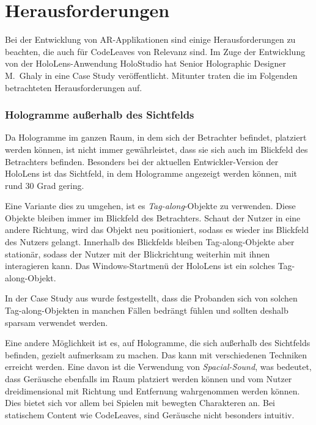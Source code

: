 \section{Herausforderungen}

Bei der Entwicklung von AR-Applikationen sind einige Herausforderungen zu beachten, die auch für CodeLeaves von Relevanz sind. Im Zuge der Entwicklung von der HoloLens-Anwendung HoloStudio hat Senior Holographic Designer M.\ Ghaly in \cite{windows2017casestudy3} eine Case Study veröffentlicht. Mitunter traten die im Folgenden betrachteten Herausforderungen auf.

\subsubsection*{Hologramme außerhalb des Sichtfelds}

Da Hologramme im ganzen Raum, in dem sich der Betrachter befindet, platziert werden können, ist nicht immer gewährleistet, dass sie sich auch im Blickfeld des Betrachters befinden. Besonders bei der aktuellen Entwickler-Version der HoloLens ist das Sichtfeld, in dem Hologramme angezeigt werden können, mit rund 30 Grad \cite{czerulla2017microsoft} gering.

Eine Variante dies zu umgehen, ist es \textit{Tag-along}-Objekte zu verwenden. Diese Objekte bleiben immer im Blickfeld des Betrachters. Schaut der Nutzer in eine andere Richtung, wird das Objekt neu positioniert, sodass es wieder ins Blickfeld des Nutzers gelangt. Innerhalb des Blickfelds bleiben Tag-along-Objekte aber stationär, sodass der Nutzer mit der Blickrichtung weiterhin mit ihnen interagieren kann. Das Windows-Startmenü der HoloLens ist ein solches Tag-along-Objekt.

In der Case Study aus \cite{windows2017casestudy3} wurde festgestellt, dass die Probanden sich von solchen Tag-along-Objekten in manchen Fällen bedrängt fühlen und sollten deshalb sparsam verwendet werden.

Eine andere Möglichkeit ist es, auf Hologramme, die sich außerhalb des Sichtfelds befinden, gezielt aufmerksam zu machen. Das kann mit verschiedenen Techniken erreicht werden. Eine davon ist die Verwendung von \textit{Spacial-Sound}, was bedeutet, dass Geräusche ebenfalls im Raum platziert werden können und vom Nutzer dreidimensional mit Richtung und Entfernung wahrgenommen werden können. Dies bietet sich vor allem bei Spielen mit bewegten Charakteren an. Bei statischem Content wie CodeLeaves, sind Geräusche nicht besonders intuitiv.

